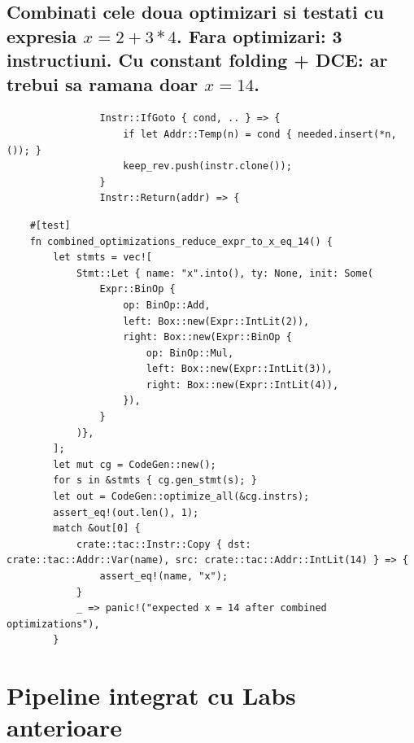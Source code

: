 \documentclass[11pt]{article}
\begin{document}
\subsection{Combinati cele doua optimizari si testati cu expresia \(x = 2 + 3 * 4\). Fara optimizari: 3 instructiuni. Cu constant folding + DCE: ar trebui sa ramana doar \(x = 14\).}
\label{sec:orgdc347d4}
\begin{verbatim}
                Instr::IfGoto { cond, .. } => {
                    if let Addr::Temp(n) = cond { needed.insert(*n, ()); }
                    keep_rev.push(instr.clone());
                }
                Instr::Return(addr) => {
\end{verbatim}
\begin{verbatim}
    #[test]
    fn combined_optimizations_reduce_expr_to_x_eq_14() {
        let stmts = vec![
            Stmt::Let { name: "x".into(), ty: None, init: Some(
                Expr::BinOp {
                    op: BinOp::Add,
                    left: Box::new(Expr::IntLit(2)),
                    right: Box::new(Expr::BinOp {
                        op: BinOp::Mul,
                        left: Box::new(Expr::IntLit(3)),
                        right: Box::new(Expr::IntLit(4)),
                    }),
                }
            )},
        ];
        let mut cg = CodeGen::new();
        for s in &stmts { cg.gen_stmt(s); }
        let out = CodeGen::optimize_all(&cg.instrs);
        assert_eq!(out.len(), 1);
        match &out[0] {
            crate::tac::Instr::Copy { dst: crate::tac::Addr::Var(name), src: crate::tac::Addr::IntLit(14) } => {
                assert_eq!(name, "x");
            }
            _ => panic!("expected x = 14 after combined optimizations"),
        }
\end{verbatim}
\section{Pipeline integrat cu Labs anterioare}
\label{sec:org743347f}
\end{document}
